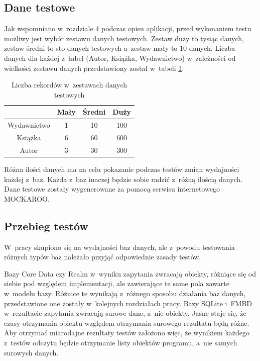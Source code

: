 \subsection{Dane testowe}

Jak wspomniano w~rozdziale  4 podczas opisu aplikacji, przed wykonaniem testu możliwy jest wybór zestawu danych testowych. Zestaw duży to tysiąc danych, zestaw średni to sto danych testowych a~zestaw mały to 10 danych. Liczba danych dla każdej z~tabel (Autor, Książka, Wydawnictwo) w~zależności od wielkości zestawu danych przedstawiony został w~tabeli \ref{tab: zestaw_danych}.

\begin{table}[h]
\centering
\caption {Liczba rekordów w~zestawach danych testowych}
\label{tab: zestaw_danych}
\begin{tabular}{|c|c|c|c|}
\hline
\multicolumn{1}{|l|}{} & Mały & Średni & Duży \\ \hline
Wydawnictwo            & 1    & 10     & 100  \\ \hline
Książka                & 6    & 60     & 600  \\ \hline
Autor                  & 3    & 30     & 300  \\ \hline
\end{tabular}
\end{table}

Różna ilości danych ma na celu pokazanie podczas testów zmian wydajności każdej z~baz. Każda z~baz inaczej będzie sobie radzić z~różną ilością danych. Dane testowe zostały wygenerowane za pomocą serwisu internetowego MOCKAROO. 

\subsection{Przebieg testów}

 W~pracy skupiono się na wydajności baz danych, ale z~powodu testowania różnych typów baz należało przyjąć odpowiednie zasady testów.\par 
Bazy Core Data czy Realm w~wyniku zapytania zwracają obiekty, różniące się od siebie pod względem implementacji, ale zawierające te same pola zawarte w~modelu bazy. Różnice te wynikają z~różnego sposobu działania baz danych, przedstawione one zostały w~kolejnych rozdziałach pracy. Bazy SQLite i~FMBD w~rezultacie zapytania zwracają surowe dane, a~nie obiekty. Jasne staje się, że czasy otrzymania obiektu względem otrzymania surowego rezultatu będą różne. Aby otrzymać miarodajne rezultaty testów założono więc, że wynikiem każdego z~testów odczytu będzie otrzymanie listy obiektów programu, a~nie samych surowych danych. 

